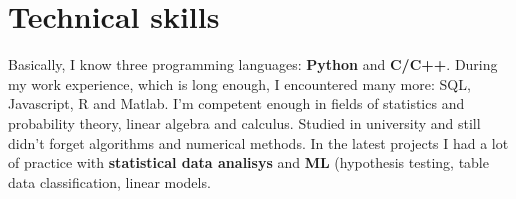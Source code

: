 \documentclass[12pt,a4paper,roman]{moderncv}
\begin{document}
\section{Technical skills}
\hspace{10mm}Basically, I know three programming languages: \textbf{Python} and \textbf{C/C++}.
During my work experience, which is long enough, I encountered many more: SQL, Javascript, R and Matlab. \newline
I'm competent enough in fields of statistics and probability theory, linear algebra and calculus.
Studied in university and still didn't forget algorithms and numerical methods. \newline
In the latest projects I had a lot of practice with \textbf{statistical data analisys} and \textbf{ML} (hypothesis testing, table data classification, linear models. \newline
\end{document}
